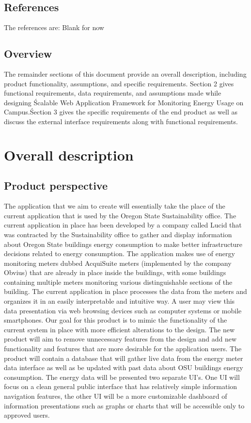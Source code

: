 \documentclass[onecolumn, draftclsnofoot,10pt, compsoc]{IEEEtran}
\begin{document}
    \subsection{References}
	The references are:
	Blank for now

    \subsection{Overview}
	The remainder sections of this document provide an overall description, including product functionality, assumptions, and specific requirements. Section 2 gives functional requirements, data requirements, and assumptions made while designing \'Scalable Web Application Framework for Monitoring Energy Usage on Campus.\' Section 3 gives the specific requirements of the end product as well as discuss the external interface requirements along with functional requirements.
	
    \section{Overall description}
    \subsection{Product perspective}
    The application that we aim to create will essentially take the place of the current application that is used by the Oregon State Sustainability office. The current application in place has been developed by a company called Lucid that was contracted by the Sustainability office to gather and display information about Oregon State buildings energy consumption to make better infrastructure decisions related to energy consumption. The application makes use of energy monitoring meters dubbed AcquiSuite meters (implemented by the company Obvius) that are already in place inside the buildings, with some buildings containing multiple meters monitoring various distinguishable sections of the building. The current application in place processes the data from the meters and organizes it in an easily interpretable and intuitive way. A user may view this data presentation via web browsing devices such as computer systems or mobile smartphones. Our goal for this product is to mimic the functionality of the current system in place with more efficient alterations to the design. The new product will aim to remove unnecessary features from the design and add new functionality and features that are more desirable for the application users. The product will contain a database that will gather live data from the energy meter data interface as well as be updated with past data about OSU buildings energy consumption. The energy data will be presented two separate UI’s. One UI will focus on a clean general public interface that has relatively simple information navigation features, the other UI will be a more customizable dashboard of information presentations such as graphs or charts that will be accessible only to approved users. 
\end{document}
